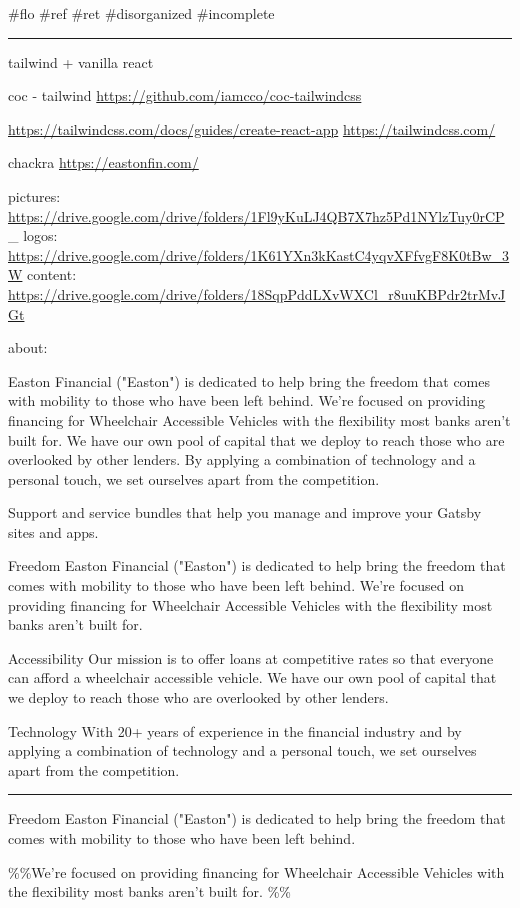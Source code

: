 \documentclass[letterpaper]{article}
\date{\today}
\title{}
\begin{document}
\#flo \#ref \#ret \#disorganized \#incomplete

\noindent\rule{\textwidth}{0.5pt}

tailwind + vanilla react

coc - tailwind \url{https://github.com/iamcco/coc-tailwindcss}

\url{https://tailwindcss.com/docs/guides/create-react-app}
\url{https://tailwindcss.com/}

chackra \url{https://eastonfin.com/}

pictures:
\url{https://drive.google.com/drive/folders/1Fl9yKuLJ4QB7X7hz5Pd1NYlzTuy0rCP}\_
logos:
\url{https://drive.google.com/drive/folders/1K61YXn3kKastC4yqvXFfvgF8K0tBw\_3W}
content:
\url{https://drive.google.com/drive/folders/18SqpPddLXvWXCl\_r8uuKBPdr2trMvJGt}

about:

Easton Financial ("Easton") is dedicated to help bring the freedom that
comes with mobility to those who have been left behind. We're focused on
providing financing for Wheelchair Accessible Vehicles with the
flexibility most banks aren't built for. We have our own pool of capital
that we deploy to reach those who are overlooked by other lenders. By
applying a combination of technology and a personal touch, we set
ourselves apart from the competition.

Support and service bundles that help you manage and improve your Gatsby
sites and apps.

Freedom Easton Financial ("Easton") is dedicated to help bring the
freedom that comes with mobility to those who have been left behind.
We're focused on providing financing for Wheelchair Accessible Vehicles
with the flexibility most banks aren't built for.

Accessibility Our mission is to offer loans at competitive rates so that
everyone can afford a wheelchair accessible vehicle. We have our own
pool of capital that we deploy to reach those who are overlooked by
other lenders.

Technology With 20+ years of experience in the financial industry and by
applying a combination of technology and a personal touch, we set
ourselves apart from the competition.

\noindent\rule{\textwidth}{0.5pt}

Freedom Easton Financial ("Easton") is dedicated to help bring the
freedom that comes with mobility to those who have been left behind.

\%\%We're focused on providing financing for Wheelchair Accessible
Vehicles with the flexibility most banks aren't built for. \%\%
\end{document}
